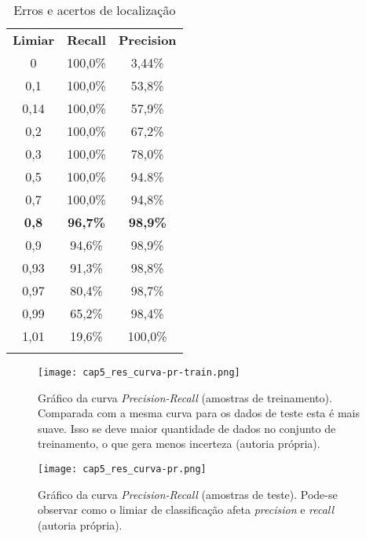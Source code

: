 \begin{table}
	\center
	\caption{Erros e acertos de localização}
	\renewcommand{\arraystretch}{1.6}
	\begin{tabular}{ccc}
		\Xhline{6\arrayrulewidth}
		\textbf{Limiar} &
			\textbf{Recall} &
			\textbf{Precision} \\
		\Xhline{2\arrayrulewidth}
			0    & 100,0\%  &  3,44\% \\
			0,1  & 100,0\%  &  53,8\% \\
			0,14 & 100,0\%  &  57,9\% \\
			0,2  & 100,0\%  &  67,2\% \\
			0,3  & 100,0\%  &  78,0\% \\
			0,5  & 100,0\%  &  94.8\% \\
			0,7  & 100,0\%  &  94,8\% \\
			\textbf{0,8}  &  \textbf{96,7\%}  &  \textbf{98,9\%} \\
			0,9  &  94,6\%  &  98,9\% \\
			0,93 &  91,3\%  &  98,8\% \\
			0,97 &  80,4\%  &  98,7\% \\
			0,99 &  65,2\%  &  98,4\% \\
			1,01 &  19,6\%  & 100,0\% \\
		\Xhline{6\arrayrulewidth}
	\end{tabular}
	\label{tbl:curva-pr}
\end{table}

\begin{figure}[!htb]
	\centering
	\texttt{[image: cap5\_res\_curva-pr-train.png]}
	\caption[Gráfico da curva \emph{Precision-Recall}
		(amostras de treinamento)]{
		Gráfico da curva \emph{Precision-Recall} (amostras de treinamento).
		Comparada com a mesma curva para os dados de teste esta é mais suave. Isso
		se deve maior quantidade de dados no conjunto de treinamento, o que gera
		menos incerteza (autoria própria).}
	\label{fig:cap5_res_curva-pr-train}
\end{figure}

\begin{figure}[!htb]
	\centering
	\texttt{[image: cap5\_res\_curva-pr.png]}
	\caption[Gráfico da curva \emph{Precision-Recall} (amostras de teste)]{
		Gráfico da curva \emph{Precision-Recall} (amostras de teste).
		Pode-se observar como o limiar de classificação afeta \emph{precision} e
		\emph{recall} (autoria própria).}
	\label{fig:cap5_res_curva-pr}
\end{figure}

